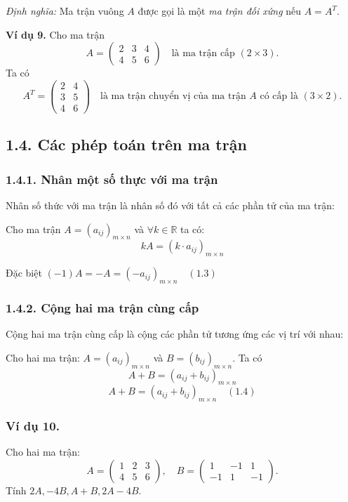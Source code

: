 \textit{Định nghĩa:} Ma trận vuông \( A \) được gọi là một \textit{ma trận đối xứng} nếu \( A = A^T \).

\textbf{Ví dụ 9.} Cho ma trận
\[
A = \begin{pmatrix}
2 & 3 & 4 \\
4 & 5 & 6
\end{pmatrix}
\quad \text{là ma trận cấp } (2 \times 3).
\]
Ta có
\[
A^T = \begin{pmatrix}
2 & 4 \\
3 & 5 \\
4 & 6
\end{pmatrix}
\quad \text{là ma trận chuyển vị của ma trận } A \text{ có cấp là } (3 \times 2).
\]

\subsection*{1.4. Các phép toán trên ma trận}
\subsubsection*{1.4.1. Nhân một số thực với ma trận}
Nhân số thức với ma trận là nhân số đó với tất cả các phần tử của ma trận:

Cho ma trận \( A = (a_{ij})_{m \times n} \) và \( \forall k \in \mathbb{R} \) ta có:
\[
kA = (k \cdot a_{ij})_{m \times n}
\]

Đặc biệt \( (-1)A = -A = (-a_{ij})_{m \times n} \quad (1.3) \)


\subsubsection*{1.4.2. Cộng hai ma trận cùng cấp}
Cộng hai ma trận cùng cấp là cộng các phần tử tương ứng các vị trí với nhau:

Cho hai ma trận: \( A = (a_{ij})_{m \times n} \) và \( B = (b_{ij})_{m \times n} \). Ta có
\[
A + B = (a_{ij} + b_{ij})_{m \times n}
\]
\[
A + B = (a_{ij} + b_{ij})_{m \times n} \quad (1.4)
\]
\subsubsection*{Ví dụ 10.}
Cho hai ma trận:
\[
A = \begin{pmatrix}
1 & 2 & 3 \\
4 & 5 & 6
\end{pmatrix}
, \quad
B = \begin{pmatrix}
1 & -1 & 1 \\
-1 & 1 & -1
\end{pmatrix}
.
\]
Tính \( 2A, -4B, A + B, 2A - 4B \).

